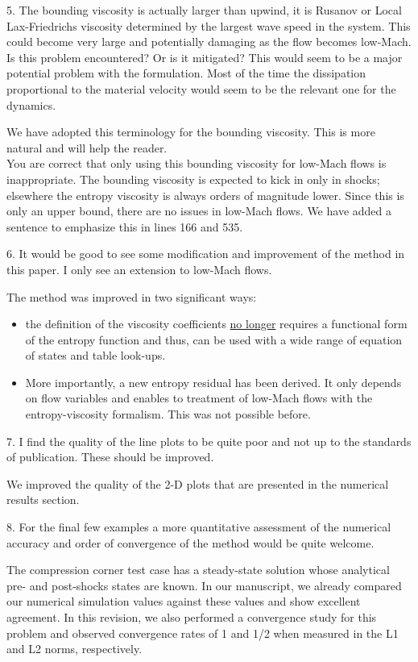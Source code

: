 \documentclass{article}
\begin{document}
{
\color{blue}
5. The bounding viscosity is actually larger than upwind, it is Rusanov or
Local Lax-Friedrichs viscosity determined by the largest wave speed in the
system. This could become very large and potentially damaging as the
flow becomes low-Mach. Is this problem encountered? Or is it mitigated?
This would seem to be a major potential problem with the formulation.
Most of the time the dissipation proportional to the material velocity
would seem to be the relevant one for the dynamics.
}

We have adopted this terminology for the bounding viscosity. This is more natural and
will help the reader. \\
You are correct that only using this bounding viscosity for low-Mach flows is inappropriate.  
The bounding viscosity is expected to kick in only in shocks; elsewhere the entropy viscosity is always orders of magnitude lower. Since this is only an upper bound, there are no issues in low-Mach flows. We have added a sentence to emphasize this in lines 166 and 535.
\bigskip


{
\color{blue}
6. It would be good to see some modification and improvement of the
method in this paper. I only see an extension to low-Mach flows.
}

The method was improved in two significant ways: 
\begin{itemize}
\item the definition of the viscosity coefficients \underline{no longer} requires a functional form of the entropy function and thus, can be used with a wide range of equation of states and table look-ups. 
\item More importantly, a new entropy residual has been derived. It only depends on flow variables and enables to treatment of low-Mach flows with the entropy-viscosity formalism. This was not possible before.
\end{itemize}
\bigskip


{
\color{blue}
7. I find the quality of the line plots to be quite poor and not up to the
standards of publication. These should be improved.
}

We improved the quality of the 2-D plots that are presented in the numerical results section. 
\bigskip


{
\color{blue}
8. For the final few examples a more quantitative assessment of the
numerical accuracy and order of convergence of the method would be
quite welcome.
}

The compression corner test case has a steady-state solution whose analytical pre- and post-shocks states are known. 
In our manuscript, we already compared our numerical simulation values against these values and show excellent agreement. 
In this revision, we also performed a convergence study for this problem and observed convergence rates of 1 and 1/2
when measured in the L1 and L2 norms, respectively. 
\end{document}
